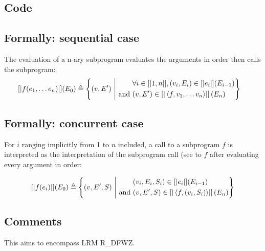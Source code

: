 \documentclass{book}
\begin{document}
  \subsection{Code}

\begin{formal}
  \subsection{Formally: sequential case}
  The evaluation of a n-ary subprogram evaluates the arguments in order then
  calls the subprogram:
  \begin{align}
  \left[| f (e_1, \dotsc e_n) \right|] (E_0) & \triangleq
    \left\{ (v, E') \ \middle|\ {}
    \begin{aligned}
      & \forall i \in [| 1, n |], (v_i, E_i) \in \left[| e_i \right|] (E_{i - 1})
      \\ \text{and}\ &
      (v, E') \in \left[| \left\langle f, v_1, \dotsc v_n \right\rangle \right|] \left(E_n\right)
    \end{aligned}
    \right\}
  \label{eq:sem-seq-fcall}
  \end{align}

  \subsection{Formally: concurrent case}
  For $i$ ranging implicitly from 1 to $n$ included, a call to a subprogram $f$
  is interpreted as the interpretation of the subprogram call (see to $f$ after
  evaluating every argument in order:

  \begin{align}
    \interp{f (e_i)} (E_0) \triangleq
      \left\{ (v, E', S) \st{}
      \begin{aligned}
        & %
          (v_i, E_i, S_i) \in \interp{e_i} (E_{i - 1})
        \\ \text{and}\ &
        (v, E', S) \in \interp{\left\langle f, (v_i,S_i) \right\rangle} \left(E_n\right)
      \end{aligned}
      \right\}
    \label{eq:sem-conc-fcall}
  \end{align}
\end{formal}

  \subsection{Comments}
  This aims to encompass LRM R\_DFWZ.
\end{document}
